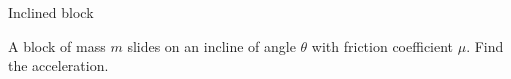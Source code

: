 ﻿\begin{problem}[10]{Inclined block}
\begin{problemstatement}
A block of mass $m$ slides on an incline of angle $\theta$ with friction coefficient $\mu$. Find the acceleration.
\end{problemstatement}
\end{problem}
